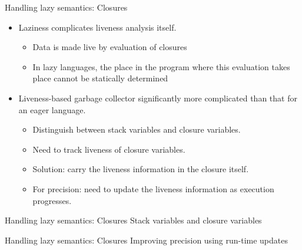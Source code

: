 \documentclass[xcolor=x11names,compress,mathserif]{beamer}
\renewcommand{\(}{\begin{columns}}
\renewcommand{\)}{\end{columns}}
\newcommand{\<}[1]{\begin{column}{#1}}
\renewcommand{\>}{\end{column}}
\begin{document}
\begin{frame}{Handling lazy semantics: Closures}
\normalsize
  \begin{itemize}\itemsep2em
  \item Laziness complicates liveness analysis itself. 
    \begin{itemize}
    \item Data is made live by evaluation of closures
    \item In lazy languages, the place in the program
      where this evaluation takes place cannot be statically determined
    \end{itemize}
    \pause
  \item Liveness-based garbage collector significantly more complicated than that for an eager language.
    \begin{itemize}
    \item Distinguish between stack variables and closure variables.
    \item Need to track liveness of closure variables.
    \item Solution: carry the liveness information in the closure itself.
    \item For precision: need to update the liveness information as execution progresses.
    \end{itemize}
  \end{itemize}
\end{frame}
\begin{frame}{Handling lazy semantics: Closures}
  Stack variables and closure variables
\end{frame}
\begin{frame}{Handling lazy semantics: Closures}
  Improving precision using run-time updates 
\end{frame}
\end{document}
